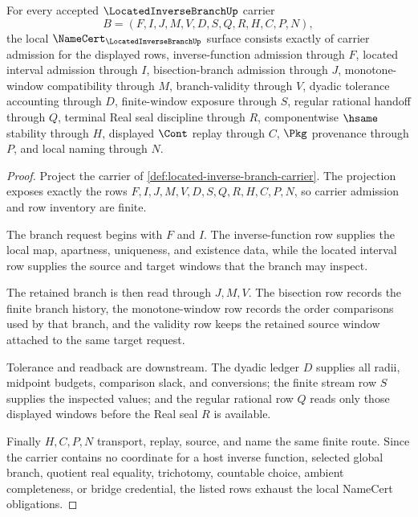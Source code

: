 \begin{theorem}
\label{thm:located-inverse-branch-namecert-obligations}
For every accepted $\LocatedInverseBranchUp$ carrier
$$
B=(F,I,J,M,V,D,S,Q,R,H,C,P,N),
$$
the local $\NameCert_{\LocatedInverseBranchUp}$ surface consists exactly of carrier admission for the displayed rows, inverse-function admission through $F$, located interval admission through $I$, bisection-branch admission through $J$, monotone-window compatibility through $M$, branch-validity through $V$, dyadic tolerance accounting through $D$, finite-window exposure through $S$, regular rational handoff through $Q$, terminal Real seal discipline through $R$, componentwise $\hsame$ stability through $H$, displayed $\Cont$ replay through $C$, $\Pkg$ provenance through $P$, and local naming through $N$.
\end{theorem}
\begin{proof}
Project the carrier of \autoref{def:located-inverse-branch-carrier}. The projection exposes exactly the rows $F,I,J,M,V,D,S,Q,R,H,C,P,N$, so carrier admission and row inventory are finite.

The branch request begins with $F$ and $I$. The inverse-function row supplies the local map, apartness, uniqueness, and existence data, while the located interval row supplies the source and target windows that the branch may inspect.

The retained branch is then read through $J,M,V$. The bisection row records the finite branch history, the monotone-window row records the order comparisons used by that branch, and the validity row keeps the retained source window attached to the same target request.

Tolerance and readback are downstream. The dyadic ledger $D$ supplies all radii, midpoint budgets, comparison slack, and conversions; the finite stream row $S$ supplies the inspected values; and the regular rational row $Q$ reads only those displayed windows before the Real seal $R$ is available.

Finally $H,C,P,N$ transport, replay, source, and name the same finite route. Since the carrier contains no coordinate for a host inverse function, selected global branch, quotient real equality, trichotomy, countable choice, ambient completeness, or bridge credential, the listed rows exhaust the local NameCert obligations.
\end{proof}

